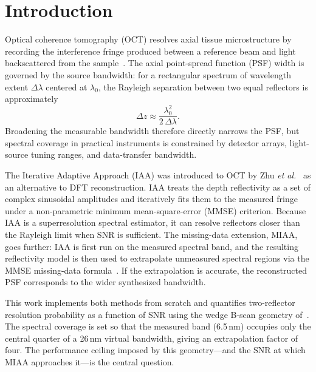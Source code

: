 \documentclass[conference]{IEEEtran}
\begin{document}
\section{Introduction}

Optical coherence tomography (OCT) resolves axial tissue microstructure
by recording the interference fringe produced between a reference beam
and light backscattered from the sample~\cite{huang1991oct}. The axial
point-spread function (PSF) width is governed by the source bandwidth:
for a rectangular spectrum of wavelength extent $\Delta\lambda$ centered
at $\lambda_0$, the Rayleigh separation between two equal reflectors is
approximately
\begin{equation}
  \Delta z \approx \frac{\lambda_0^2}{2\,\Delta\lambda}.
  \label{eq:rayleigh}
\end{equation}
Broadening the measurable bandwidth therefore directly narrows the PSF,
but spectral coverage in practical instruments is constrained by
detector arrays, light-source tuning ranges, and data-transfer
bandwidth.

The Iterative Adaptive Approach (IAA) was introduced to OCT by Zhu
\emph{et al.}~\cite{zhu2012iaa} as an alternative to DFT
reconstruction. IAA treats the depth reflectivity as a set of complex
sinusoidal amplitudes and iteratively fits them to the measured fringe
under a non-parametric minimum mean-square-error (MMSE) criterion.
Because IAA is a superresolution spectral estimator, it can resolve
reflectors closer than the Rayleigh limit when SNR is sufficient. The
missing-data extension, MIAA, goes further: IAA is first run on the
measured spectral band, and the resulting reflectivity model is then
used to extrapolate unmeasured spectral regions via the MMSE
missing-data formula~\cite{stoica2009missing}. If the extrapolation is
accurate, the reconstructed PSF corresponds to the wider synthesized
bandwidth.

This work implements both methods from scratch and quantifies
two-reflector resolution probability as a function of SNR using the
wedge B-scan geometry of~\cite{zhu2012iaa}. The spectral coverage is
set so that the measured band (6.5\,nm) occupies only the central
quarter of a 26\,nm virtual bandwidth, giving an extrapolation factor
of four. The performance ceiling imposed by this geometry---and the SNR
at which MIAA approaches it---is the central question.

\end{document}
